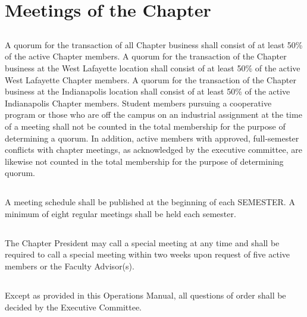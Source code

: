 \documentclass[10pt, oneside]{article}
\begin{document}
\section{Meetings of the Chapter}
\subsection{}
A quorum for the transaction of all Chapter business shall consist of at least 50\% of the active Chapter members. A quorum for the transaction of the Chapter business at the West Lafayette location shall consist of at least 50\% of the active West Lafayette Chapter members. A quorum for the transaction of the Chapter business at the Indianapolis location shall consist of at least 50\% of the active Indianapolis Chapter members. Student members pursuing a cooperative program or those who are off the campus on an industrial assignment at the time of a meeting shall not be counted in the total membership for the purpose of determining a quorum. In addition, active members with approved, full-semester conflicts with chapter meetings, as acknowledged by the executive committee, are likewise not counted in the total membership for the purpose of determining quorum.

\subsection{}
A meeting schedule shall be published at the beginning of each SEMESTER. A minimum of eight regular meetings shall be held each semester.

\subsection{}
The Chapter President may call a special meeting at any time and shall be required to call a special meeting within two weeks upon request of five active members or the Faculty Advisor(s).

\subsection{}
Except as provided in this Operations Manual, all questions of order shall be decided by the Executive Committee.
\end{document}
